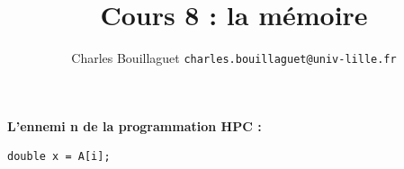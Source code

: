 \documentclass[xcolor={x11names,svgnames}, 14pt]{beamer}
\author[C.~Bouillaguet]{Charles Bouillaguet \newline
  {\small \texttt{charles.bouillaguet@univ-lille.fr}}}
\title{Cours 8 : la mémoire}
\begin{document}
\begin{frame}[label=title]
    \titlepage
  \end{frame}
  

\begin{frame}[label=golden_rule,fragile]

  \centering
  
    \huge \bf {L'ennemi n de la programmation HPC :}

  \vspace{2cm}\pause
\begin{center}
\begin{verbatim}
double x = A[i];
\end{verbatim}
\end{center}
\end{frame}
\end{document}
